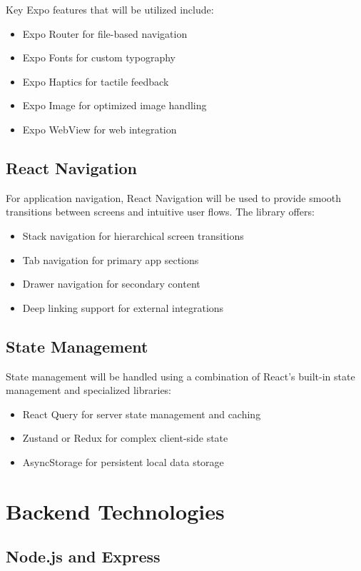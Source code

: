 \documentclass[12pt,a4paper]{report}
\begin{document}
Key Expo features that will be utilized include:
\begin{itemize}
    \item Expo Router for file-based navigation
    \item Expo Fonts for custom typography
    \item Expo Haptics for tactile feedback
    \item Expo Image for optimized image handling
    \item Expo WebView for web integration
\end{itemize}

\subsection*{React Navigation}

For application navigation, React Navigation will be used to provide smooth transitions between screens and intuitive user flows. The library offers:
\begin{itemize}
    \item Stack navigation for hierarchical screen transitions
    \item Tab navigation for primary app sections
    \item Drawer navigation for secondary content
    \item Deep linking support for external integrations
\end{itemize}

\subsection*{State Management}

State management will be handled using a combination of React's built-in state management and specialized libraries:
\begin{itemize}
    \item React Query for server state management and caching
    \item Zustand or Redux for complex client-side state
    \item AsyncStorage for persistent local data storage
\end{itemize}

\section*{Backend Technologies}

\subsection*{Node.js and Express}
\end{document}
